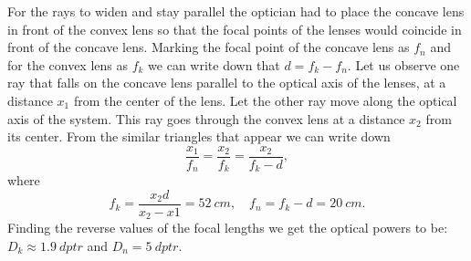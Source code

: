 \documentclass[11pt]{article}
\begin{document}
\solueng
For the rays to widen and stay parallel the optician had to place the concave lens in front of the convex lens so that the focal points of the lenses would coincide in front of the concave lens. Marking the focal point of the concave lens as $f_{n}$ and for the convex lens as $f_{k}$ we can write down that $d=f_{k}-f_{n}$. Let us observe one ray that falls on the concave lens parallel to the optical axis of the lenses, at a distance $x_{1}$ from the center of the lens. Let the other ray move along the optical axis of the system. This ray goes through the convex lens at a distance $x_{2}$ from its center. From the similar triangles that appear we can write down
\[ \frac{x_{1}}{f_{n}}=\frac{x_{2}}{f_{k}}=\frac{x_{2}}{f_{k}-d}, \] 
where
\[ f_{k}=\frac{x_{2}d}{x_{2}-x{1}}=\SI{52}{cm},\quad  f_{n}=f_{k}-d=\SI{20}{cm}.\] 
Finding the reverse values of the focal lengths we get the optical powers to be: $D_{k}\approx\SI{1,9}{dptr}$ and $D_{n}=\SI{5}{dptr}$.
\probend
\bigskip

\end{document}
